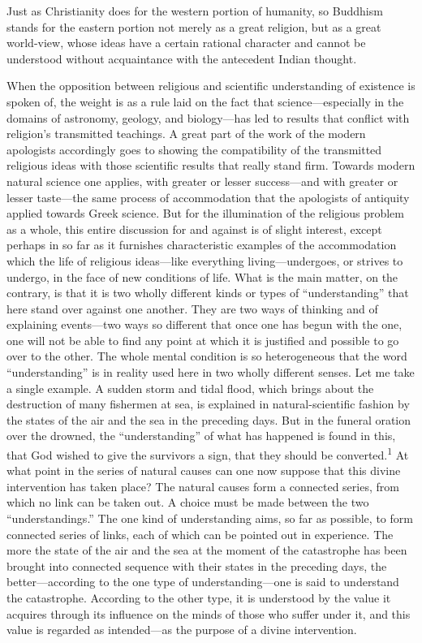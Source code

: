 \documentclass[12pt,a4paper]{book}
\newcommand{\opage}[1]{\marginnote{\footnotesize\textit{[#1]}}}
\begin{document}
Just as Christianity does for the western portion of humanity, so
Buddhism stands for the eastern portion not merely as a great religion,
but as a great world-view, whose ideas have a certain rational character
and cannot be understood without acquaintance with the antecedent Indian
thought.

When the opposition between religious and scientific understanding of
existence is spoken of, the weight is as a rule laid on the fact that
science---especially in the domains of astronomy, geology, and
biology---has led to results that conflict with religion's transmitted
teachings. A great part of the work of the modern apologists accordingly
goes to showing the compatibility of the transmitted religious ideas
with those scientific results that really stand firm. Towards modern
natural science one applies, with greater or lesser success---and with
greater or lesser taste---the same process of accommodation that the
apologists of antiquity applied towards Greek science. But for the
illumination of the religious problem as a whole, this entire discussion
for and against is of slight interest, except perhaps in so far as it
furnishes characteristic examples of the accommodation which the life of
religious ideas---like everything living---undergoes, or strives to
undergo, in the face of new conditions of life. What is the main matter,
on the contrary, is that it is two wholly different kinds or types of
``understanding'' that here stand over against one another. They are two
ways of thinking and of explaining events---two ways so different that
once one has begun with the one, one will not be able to find any point
at which it is justified and possible 
\opage{17}to go over to the other. The whole
mental condition is so heterogeneous that the word ``understanding'' is
in reality used here in two wholly different senses. Let me take a
single example. A sudden storm and tidal flood, which brings about the
destruction of many fishermen at sea, is explained in natural-scientific
fashion by the states of the air and the sea in the preceding days. But
in the funeral oration over the drowned, the ``understanding'' of what
has happened is found in this, that God wished to give the survivors a
sign, that they should be converted.\textsuperscript{1} At what point in
the series of natural causes can one now suppose that this divine
intervention has taken place? The natural causes form a connected
series, from which no link can be taken out. A choice must be made
between the two ``understandings.'' The one kind of understanding aims,
so far as possible, to form connected series of links, each of which can
be pointed out in experience. The more the state of the air and the sea
at the moment of the catastrophe has been brought into connected
sequence with their states in the preceding days, the better---according
to the one type of understanding---one is said to understand the
catastrophe. According to the other type, it is understood by the value
it acquires through its influence on the minds of those who suffer under
it, and this value is regarded as intended---as the purpose of a divine
intervention.
\end{document}
